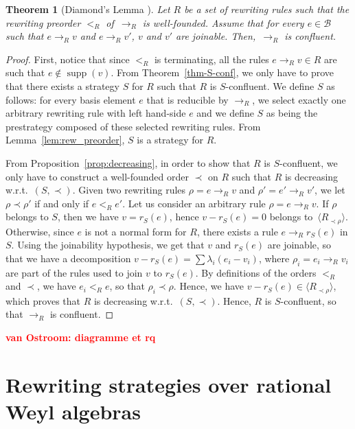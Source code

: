 \documentclass[11pt]{article}
\newtheorem{theorem}{Theorem}[section]
\theoremstyle{definition}
\newcommand\wrt{w.r.t.}
\newcommand\todo[1]{{\bf\textcolor{red}{#1}}}
\newcommand\basis{\mathscr{B}}
\newcommand\ordR{<_R}
\newcommand\Rrho{R_{\prec\rho}}
\DeclareMathOperator{\supp}{supp}
\newcommand\Span[1]{\langle #1\rangle}
\newcommand\rewR{\to_R}
\begin{document}
\begin{theorem}[Diamond's Lemma \cite{MR506890}]
  \label{thm:diamond_lemma}
  Let $R$ be a set of rewriting rules such that the rewriting preorder
  $\ordR$ of~$\rewR$ is well-founded. Assume that  for every $e\in\basis$
  such that $e\rewR v$ and $e\rewR v'$, $v$ and $v'$ are joinable. 
  Then,~$\rewR$ is confluent.
\end{theorem}

\begin{proof}
  First, notice that since $\ordR$ is terminating, all the rules
  $e\rewR v\in R$ are such that $e\notin\supp(v)$. From
  Theorem~\ref{thm-S-conf}, we only have to prove that there exists a
  strategy $S$ for $R$ such that $R$ is $S$-confluent. We define $S$ as
  follows: for every basis element $e$ that is reducible by $\rewR$, we
  select exactly one arbitrary rewriting rule with left hand-side $e$ and
  we define $S$ as being the prestrategy composed of these selected
  rewriting rules. From Lemma~\ref{lem:rew_preorder}, $S$ is a strategy
  for $R$.
  \smallskip

  From Proposition~\ref{prop:decreasing}, in order to show that $R$ is
  $S$-confluent, we only have to construct a well-founded order $\prec$
  on $R$ such that $R$ is decreasing \wrt\ $(S,\prec)$. Given two
  rewriting rules $\rho=e\rewR v$ and $\rho'=e'\rewR v'$, we let
  $\rho\prec\rho'$ if and only if $e\ordR e'$. Let us consider an
  arbitrary rule $\rho=e\rewR v$. If $\rho$ belongs to $S$, then we have
  $v=r_S(e)$, hence $v-r_S(e)=0$ belongs to~$\Span{\Rrho}$. Otherwise,
  since $e$ is not a normal form for $R$, there exists a rule
  $e\rewR r_S(e)$ in $S$. Using the joinability hypothesis, we get that
  $v$ and $r_S(e)$ are joinable, so that we have a decomposition
  $v-r_S(e)=\sum\lambda_i(e_i-v_i)$, where $\rho_i=e_i\rewR v_i$ are part
  of the rules used to join $v$ to $r_S(e)$. By definitions of the orders
  $\ordR$ and $\prec$, we have $e_i\ordR e$, so that $\rho_i\prec\rho$.
  Hence, we have $v-r_S(e)\in\Span{\Rrho}$, which proves that $R$ is
  decreasing \wrt\ $(S,\prec)$. Hence, $R$ is $S$-confluent, so that
  $\rewR$ is confluent.
\end{proof}
\todo{van Ostroom: diagramme et rq}

\section{Rewriting strategies over rational Weyl algebras}
\label{sec:rewriting_strategies_over_rational_Weyl_algebras}
\end{document}
